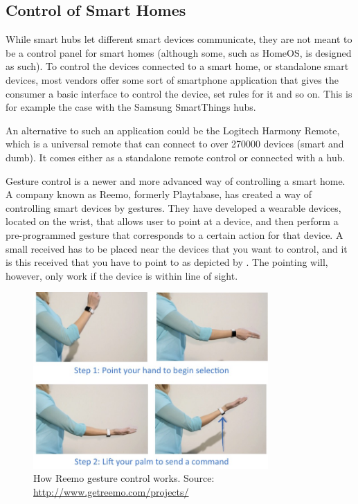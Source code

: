 \subsection{Control of Smart Homes}
While smart hubs let different smart devices communicate, 
they are not meant to be a control panel for smart homes (although some, such as HomeOS, is designed as such).
To control the devices connected to a smart home, or standalone smart devices, 
most vendors offer some sort of smartphone application that gives the consumer a basic interface to control the device, set rules for it and so on.
This is for example the case with the Samsung SmartThings hubs. 

An alternative to such an application could be the Logitech Harmony Remote\cite{HARMONYREMOTE}, 
which is a universal remote that can connect to over \num{270000} devices (smart and dumb). 
It comes either as a standalone remote control or connected with a hub. 

Gesture control is a newer and more advanced way of controlling a smart home. 
A company known as Reemo\cite{Reemo}, formerly Playtabase, has created a way of controlling smart devices by gestures. 
They have developed a wearable devices, located on the wrist, that allows user to point at a device, 
and then perform a pre-programmed gesture that corresponds to a certain action for that device. 
A small received has to be placed near the devices that you want to control, 
and it is this received that you have to point to as depicted by . 
The pointing will, however, only work if the device is within line of sight. 

\begin{figure}[!htb]
    \centering
    \includegraphics[width=0.8\textwidth]{images/Reemo}
    \caption{How Reemo gesture control works. Source: \url{http://www.getreemo.com/projects/}}
    \label{fig:reemo}
\end{figure}

